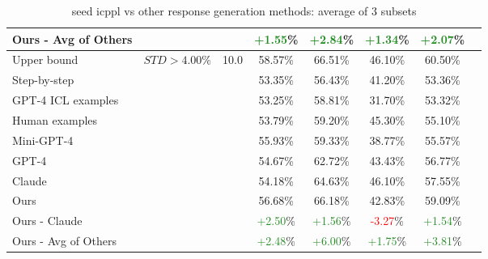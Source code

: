 \begin{table*}[t!]
{\begin{tabular}{l|l|c|c|c|c|c|c}
    Ours - Avg of Others  &   &   & \textcolor{ForestGreen}{+1.55}\% & \textcolor{ForestGreen}{+2.84}\% & \textcolor{ForestGreen}{+1.34}\% & \textcolor{ForestGreen}{+2.07}\% \\
    \hline
    Upper bound  & $STD > 4.00\%$ & 10.0 & 58.57\% & 66.51\% & 46.10\% & 60.50\% \\
    Step-by-step  &   &   & 53.35\% & 56.43\% & 41.20\% & 53.36\% \\
    GPT-4 ICL examples  &   &   & 53.25\% & 58.81\% & 31.70\% & 53.32\% \\
    Human examples  &   &   & 53.79\% & 59.20\% & 45.30\% & 55.10\% \\
    Mini-GPT-4  &   &   & 55.93\% & 59.33\% & 38.77\% & 55.57\% \\
    GPT-4  &   &   & 54.67\% & 62.72\% & 43.43\% & 56.77\% \\
    Claude  &   &   & 54.18\% & 64.63\% & 46.10\% & 57.55\% \\
    Ours  &   &   & 56.68\% & 66.18\% & 42.83\% & 59.09\% \\
    \hline
    Ours - Claude  &   &   & \textcolor{ForestGreen}{+2.50}\% & \textcolor{ForestGreen}{+1.56}\% & \textcolor{red}{-3.27}\% & \textcolor{ForestGreen}{+1.54}\% \\
    Ours - Avg of Others  &   &   & \textcolor{ForestGreen}{+2.48}\% & \textcolor{ForestGreen}{+6.00}\% & \textcolor{ForestGreen}{+1.75}\% & \textcolor{ForestGreen}{+3.81}\% \\
    \hline
  \end{tabular}}
  \caption{seed icppl vs other response generation methods: average of 3 subsets}
  \label{tab:icppl vs other response generation methods: average of 3 subsets}
\end{table*}
